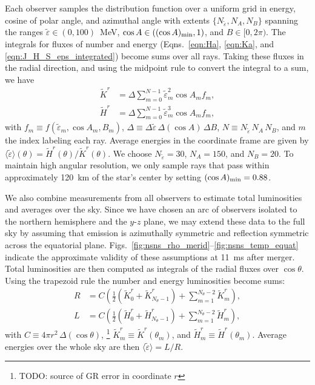 \documentclass[aps,floatfix,prd,superscriptaddress,twocolumn]{revtex4-1}
\begin{document}
Each observer samples the distribution function over a uniform grid
in energy, cosine of polar angle, and azimuthal angle with extents
$\{N_{\tilde{\varepsilon}},N_A, N_B\}$ spanning the ranges
$\tilde{\varepsilon}\in(0,100)$~MeV,
$\cos A\in\left((\cos A)_{\rm min}, 1\right)$, and
$B\in[0,2\pi)$.
The integrals for fluxes of number and energy
(Eqns.~\ref{eqn:Ha}, \ref{eqn:Ka}, and \ref{eqn:J_H_S_eps_integrated})
become sums over all rays.
Taking these fluxes in the radial direction,
and using the midpoint rule to convert the integral to a sum, we have
\begin{align}
  \label{eqn:Kr_minkowski}
  \tilde{K}^r &= \Delta
  \sum\limits_{m=0}^{N-1}
  \tilde{\varepsilon}_m^2 \cos A_m f_m,\\
  \label{eqn:Hr_minkowski}
  \tilde{H}^r &= \Delta
  \sum\limits_{m=0}^{N-1}
  \tilde{\varepsilon}_m^3 \cos A_m f_m,
\end{align}
with $f_m \equiv f(\tilde{\varepsilon}_m,\cos A_m, B_m)$,
$\Delta \equiv \Delta\tilde{\varepsilon}\, \Delta(\cos A)\, \Delta B$,
$N \equiv N_{\tilde{\varepsilon}}\, N_A\, N_B$,
and $m$ the index labeling each ray.
Average energies in the coordinate frame are given by
$\langle\tilde{\varepsilon}\rangle(\theta)=\tilde{H}^r(\theta)/\tilde{K}^r(\theta)$.
We choose $N_{\tilde{\varepsilon}}=30$, $N_A=150$, and $N_B=20$.
To maintain high angular resolution, we only sample rays that pass within
approximately 120~km of the star's center by setting $(\cos A)_{\rm min}=0.88$.

We also combine measurements from all observers to estimate
total luminosities and averages over the sky.
Since we have chosen an arc of observers isolated to the northern hemisphere and
the $y$-$z$ plane, we may extend these data to the full sky by assuming that
emission is azimuthally symmetric and reflection symmetric across the
equatorial plane. Figs.~\ref{fig:nsns_rho_merid}--\ref{fig:nsns_temp_equat}
indicate the approximate validity of these assumptions at 11~ms after merger.
Total luminosities are then computed as integrals of the radial fluxes
over $\cos\theta$.
Using the trapezoid rule the number and energy luminosities become sums:
\begin{align}
  \label{eqn:luminosity_R}
  R &= C
  \left(\frac{1}{2}(\tilde{K}^r_0+\tilde{K}^r_{N_\theta-1})
  +\sum\limits_{m=1}^{N_\theta-2}\tilde{K}^r_m\right),\\
  \label{eqn:luminosity_L}
  L &= C
  \left(\frac{1}{2}(\tilde{H}^r_0+\tilde{H}^r_{N_\theta-1})
  +\sum\limits_{m=1}^{N_\theta-2}\tilde{H}^r_m\right),
\end{align}
with $C \equiv 4\pi r^2\, \Delta(\cos \theta)$,
\footnote{TODO: source of GR error in coordinate $r$}
$\tilde{K}^r_m \equiv \tilde{K}^r(\theta_m)$, and
$\tilde{H}^r_m \equiv \tilde{H}^r(\theta_m)$.
Average energies over the whole sky are then
$\langle\tilde{\varepsilon}\rangle=L/R$.
\end{document}
